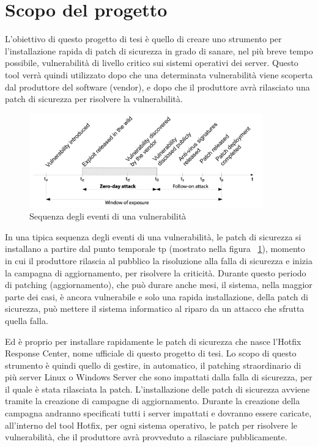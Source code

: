 %
%
\section{Scopo del progetto}
L'obiettivo di questo progetto di tesi è quello di creare uno strumento 
per l'installazione rapida di patch di sicurezza in grado di sanare, 
nel più breve tempo possibile, vulnerabilità di livello critico sui 
sistemi operativi dei server.
Questo tool verrà quindi utilizzato dopo che una determinata 
vulnerabilità viene scoperta dal produttore del software (vendor), e dopo che 
il produttore avrà rilasciato una patch di sicurezza per risolvere la 
vulnerabilità.
\begin{figure}[H]
  \begin{flushright}
    \centering
    \includegraphics[width=0.90\textwidth]{imgs/vulnerability_windows.png}
    \caption{Sequenza degli eventi di una vulnerabilità}
    \label{fig:Sequenza degli eventi di una vulnerabilità}
  \end{flushright}
\end{figure}

In una tipica sequenza degli eventi di una vulnerabilità, le patch di 
sicurezza si installano a partire dal punto temporale tp 
(mostrato nella figura ~\ref{fig:Sequenza degli eventi di una vulnerabilità}), 
momento in cui il produttore rilascia al pubblico la risoluzione alla 
falla di sicurezza e inizia la campagna di aggiornamento, per risolvere la criticità. 
Durante questo periodo di patching (aggiornamento), che può durare anche 
mesi, il sistema, nella maggior parte dei casi, è ancora vulnerabile e 
solo una rapida installazione, della patch di sicurezza, può mettere il 
sistema informatico al riparo da un attacco che sfrutta quella falla.

Ed è proprio per installare rapidamente le patch di sicurezza che nasce 
l’Hotfix Response Center, nome ufficiale di questo progetto di tesi.
Lo scopo di questo strumento è quindi quello di gestire, in automatico, 
il patching straordinario di più server Linux o Windows Server che sono 
impattati dalla falla di sicurezza, per il quale è stata rilasciata 
la patch.
L’installazione delle patch di sicurezza avviene tramite la creazione 
di campagne di aggiornamento. Durante la creazione della 
campagna andranno specificati tutti i server impattati e dovranno essere 
caricate, all’interno del tool Hotfix, per ogni sistema operativo, le 
patch per risolvere le vulnerabilità, che il produttore avrà provveduto 
a rilasciare pubblicamente.

